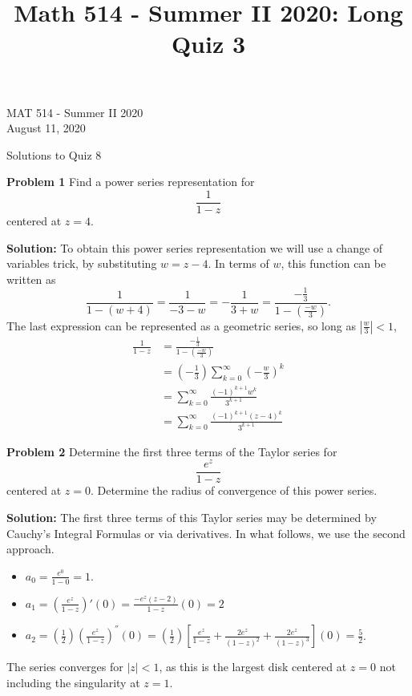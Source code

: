 \documentclass[12pt,oneside]{exam}
\title{Math 514 - Summer II 2020: Long Quiz 3}
\newenvironment{exercise}[1]{\vspace{.1in}\noindent\textbf{Problem #1 \hspace{.05em}}}{}
\begin{document}
\begin{flushright}
\sc MAT 514 - Summer II 2020\\
August 11, 2020
\end{flushright}
\bigskip
 
\begin{center}
\textsf{Solutions to Quiz 8} 
\end{center}

\begin{exercise}{1}
Find a power series representation for 
\begin{equation*}
\frac{1}{1-z}
\end{equation*}
centered at $z=4$. 
\end{exercise}

\vspace{0.5cm}

\textbf{Solution:} To obtain this power series representation we will use a change of variables trick, by substituting $w=z-4$. In terms of $w$, this function can be written as 
\begin{equation*}
\frac{1}{1-(w+4)} = \frac{1}{-3-w} = -\frac{1}{3+w} = \frac{-\frac{1}{3}}{1-\left(\frac{-w}{3}\right)}.
\end{equation*}
The last expression can be represented as a geometric series, so long as $|\frac{w}{3}| < 1$, 
\begin{align*}
\frac{1}{1-z} & = \frac{-\frac{1}{3}}{1-\left(\frac{-w}{3}\right)}\\
& = \left(-\frac{1}{3}\right) \sum_{k=0}^{\infty} \left(-\frac{w}{3}\right)^k \\
& = \sum_{k=0}^{\infty} \frac{(-1)^{k+1}w^k}{3^{k+1}}\\
& = \sum_{k=0}^{\infty} \frac{(-1)^{k+1}(z-4)^k}{3^{k+1}}
\end{align*}
\vspace{1cm}

\begin{exercise}{2}
Determine the first three terms of the Taylor series for 
\begin{equation*}
\frac{e^z}{1-z}
\end{equation*}
centered at $z=0$. Determine the radius of convergence of this power series. 
\end{exercise}

\vspace{0.5cm}

\textbf{Solution:} The first three terms of this Taylor series may be determined by Cauchy's Integral Formulas or via derivatives. In what follows, we use the second approach. 
\begin{itemize}
\item $a_0 = \frac{e^0}{1-0}= 1$.
\item $a_1 = \left(\frac{e^z}{1-z}\right)'(0) = \frac{-e^{z}(z-2)}{1-z} (0)=2$
\item $a_2 = \left(\frac{1}{2}\right)\left(\frac{e^z}{1-z}\right)^{''}(0) =  \left(\frac{1}{2}\right) \left[ \frac{e^z}{1-z}	+ \frac{2e^z}{(1-z)^2}+ \frac{2e^z}{(1-z)^3}\right](0) = \frac{5}{2}$.
\end{itemize}
The series converges for $|z|<1$, as this is the largest disk centered at $z=0$ not including the singularity at $z=1$. 
\end{document}
